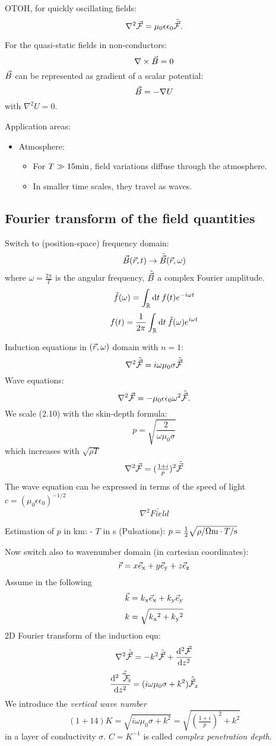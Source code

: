 OTOH, for quickly oscillating fields: \setcounter{equation}{7}\[
  \nabla^2\vec{\mathcal{F}} = \mu_0\epsilon\epsilon_0\ddot{\vec{\mathcal{F}}}.
\]

For the quasi-static fields in non-conductors: \[
  \nabla\times\vec{B} = 0
\] $\vec{B}$ can be represented as gradient of a scalar potential: \[
  \vec{B} = -\nabla U
\] with $\nabla^2 U = 0$.

Application areas:

\begin{itemize}
\itemsep1pt\parskip0pt
\item
  Atmosphere:

  \begin{itemize}
  \itemsep1pt\parskip0pt
  \item
    For $T\gg15\mathrm{min}$, field variations diffuse through the
    atmosphere.
  \item
    In smaller time scales, they travel as waves.
  \end{itemize}
\end{itemize}

\subsection{Fourier transform of the field
quantities}\label{fourier-transform-of-the-field-quantities}

Switch to (position-space) frequency domain: \[
  \vec{B}(\vec{r},t) \to \tilde{\vec{B}}(\vec{r}, \omega)
\] where $\omega=\frac{2\pi}T$ is the angular frequency, $\tilde{\vec{B}}$ a
complex Fourier amplitude. \[
  \tilde f(\omega) = \int_\mathbb{R}\mathrm{d}{t}\: f(t)e^{-i\omega t}
\] \[
  f(t) = \frac1{2\pi}\int_\mathbb{R}\mathrm{d}{t}\: \tilde f(\omega)e^{i\omega t}
\]

Induction equations in $(\vec{r},\omega)$ domain with $n=1$: \setcounter{equation}{10}\[
  \nabla^2\tilde{\vec{\mathcal{F}}} = i\omega\mu_0\sigma\tilde{\vec{\mathcal{F}}}
\] Wave equations: \[
  \nabla^2\vec{\mathcal{F}} = -\mu_0\epsilon\epsilon_0\omega^2\tilde{\vec{\mathcal{F}}}.
\] We scale (2.10) with the skin-depth formula: \[
  p = \sqrt{\frac{2}{\omega\mu_0\sigma}}
\] which increases with $\sqrt{\rho T}$ \[
  \nabla^2\vec{\mathcal{F}} = (\tfrac{1+i}{p})^2\tilde{\vec{\mathcal{F}}}
\] The wave equation can be expressed in terms of the speed of light
$c = (\mu_0\epsilon\epsilon_0)^{-1/2}$ \[
  \nabla^2\tilde{Field}
\]

Estimation of $p$ in km: - $T$ in s (Pulsations):
$p = \tfrac12\sqrt{\rho/\mathrm{\Omega m} \cdot T/\mathrm{s}}$

Now switch also to wavenumber domain (in cartesian coordinates): \[
  \vec{r} = x \vec{e}\text{$_{\mathrm{x}}$} + y\vec{e}\text{$_{\mathrm{y}}$} + z\vec{e}\text{$_{\mathrm{z}}$}
\] Assume in the following \[
  \vec{k} = k\text{$_{\mathrm{x}}$}\vec{e}\text{$_{\mathrm{x}}$} + k\text{$_{\mathrm{y}}$}\vec{e}\text{$_{\mathrm{y}}$}
\] \[
  k = \sqrt{k\text{$_{\mathrm{x}}$}^2 + k\text{$_{\mathrm{y}}$}^2}
\] 2D Fourier transform of the induction eqn: \setcounter{equation}{13}\[
  \nabla^2\hat{\vec{\mathcal{F}}} = -k^2 \hat{\vec{\mathcal{F}}} + \frac{\mathrm{d}^2\vec{\mathcal{F}}}{\mathrm{d} z^2}
\] \[
  \frac{\mathrm{d}^2\hat{\vec{\mathcal{F}}_x}}{\mathrm{d} z^2} = (i\omega\mu_0\sigma + k^2)\hat{\vec{\mathcal{F}}}_x
\] We introduce the \emph{vertical wave number} \[(1+14)
  K = \sqrt{i\omega\mu_0\sigma + k^2} = \sqrt{(\tfrac{1+i}{p})^2 + k^2}
\] in a layer of conductivity $\sigma$. $C = K^{-1}$ is called
\emph{complex penetration depth}.

